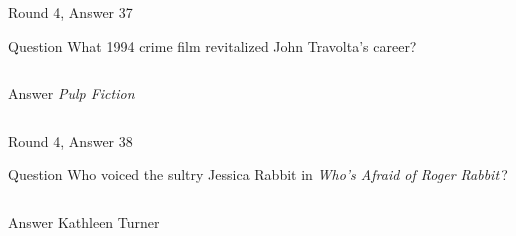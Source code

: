 \documentclass[11pt]{beamer}
\begin{document}
\begin{frame}[t]{Round 4, Answer 37}
  \vspace{2em}
  \begin{block}{Question}
    What 1994 crime film revitalized John Travolta's career?
  \end{block}
  \pause{}
  \begin{columns}[T,totalwidth=\linewidth]
    \begin{column}{0.35\linewidth}
      \begin{block}{Answer}
        \emph{Pulp Fiction}
      \end{block}
    \end{column}
    \begin{column}{0.6\linewidth}
      \begin{center}
        \texttt{[image: \{Images/travolta]}.jpg}
      \end{center}
    \end{column}
  \end{columns}
\end{frame}


\begin{frame}[t]{Round 4, Answer 38}
  \vspace{2em}
  \begin{block}{Question}
    Who voiced the sultry Jessica Rabbit in \emph{Who's Afraid of Roger Rabbit}\,?
  \end{block}
  \pause{}
  \begin{columns}[T,totalwidth=\linewidth]
    \begin{column}{0.35\linewidth}
      \begin{block}{Answer}
        Kathleen Turner
      \end{block}
    \end{column}
    \begin{column}{0.6\linewidth}
      \begin{center}
        \texttt{[image: \{Images/jessicarabbit]}.jpg}
      \end{center}
    \end{column}
  \end{columns}
\end{frame}
\end{document}
